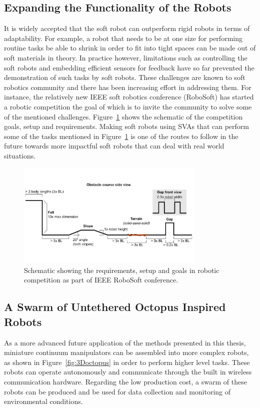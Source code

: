 \subsection{Expanding the Functionality of the Robots}
It is widely accepted that the soft robot can outperform rigid robots in terms of adaptability. For example, a robot that needs to be at one size for performing routine tasks be able to shrink in order to fit into tight spaces can be made out of soft materials in theory. In practice however, limitations such as controlling the soft robots and embedding efficient sensors for feedback have so far prevented the demonstration of such tasks by soft robots. These challenges are known to soft robotics community and there has been increasing effort in addressing them. For instance, the relatively new IEEE soft robotics conference (RoboSoft) has started a robotic competition the goal of which is to invite the community to solve some of the mentioned challenges. Figure~\ref{fig:sorocomp} shows the schematic of the competition goals, setup and requirements. Making soft robots using SVAs that can perform some of the tasks mentioned in Figure~\ref{fig:sorocomp} is one of the routes to follow in the future towards more impactful soft robots that can deal with real world situations. 
\begin{figure}[!t]
\centering
\includegraphics[width=0.8\textwidth]{sorocomp.pdf}
    \caption[]{Schematic showing the requirements, setup and goals in robotic competition as part of IEEE RoboSoft conference.}
    \label{fig:sorocomp}
\end{figure}

\subsection{A Swarm of Untethered Octopus Inspired Robots}
As a more advanced future application of the methods presented in this thesis, miniature continuum manipulators can be assembled into more complex robots, as shown in Figure~\ref{fig:3Doctopus} in order to perform higher level tasks. These robots can operate autonomously and communicate through the built in wireless communication hardware. Regarding the low production cost, a swarm of these robots can be produced and be used for data collection and monitoring of environmental conditions. 


